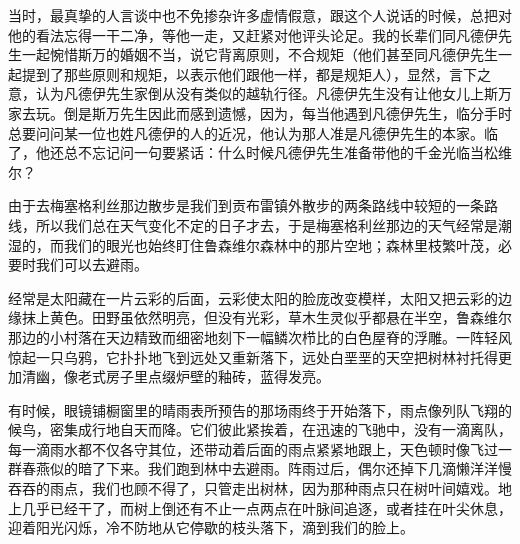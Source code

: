 \par 当时，最真挚的人言谈中也不免掺杂许多虚情假意，跟这个人说话的时候，总把对他的看法忘得一干二净，等他一走，又赶紧对他评头论足。我的长辈们同凡德伊先生一起惋惜斯万的婚姻不当，说它背离原则，不合规矩（他们甚至同凡德伊先生一起提到了那些原则和规矩，以表示他们跟他一样，都是规矩人），显然，言下之意，认为凡德伊先生家倒从没有类似的越轨行径。凡德伊先生没有让他女儿上斯万家去玩。倒是斯万先生因此而感到遗憾，因为，每当他遇到凡德伊先生，临分手时总要问问某一位也姓凡德伊的人的近况，他认为那人准是凡德伊先生的本家。临了，他还总不忘记问一句要紧话：什么时候凡德伊先生准备带他的千金光临当松维尔？
\par 由于去梅塞格利丝那边散步是我们到贡布雷镇外散步的两条路线中较短的一条路线，所以我们总在天气变化不定的日子才去，于是梅塞格利丝那边的天气经常是潮湿的，而我们的眼光也始终盯住鲁森维尔森林中的那片空地；森林里枝繁叶茂，必要时我们可以去避雨。
\par 经常是太阳藏在一片云彩的后面，云彩使太阳的脸庞改变模样，太阳又把云彩的边缘抹上黄色。田野虽依然明亮，但没有光彩，草木生灵似乎都悬在半空，鲁森维尔那边的小村落在天边精致而细密地刻下一幅鳞次栉比的白色屋脊的浮雕。一阵轻风惊起一只乌鸦，它扑扑地飞到远处又重新落下，远处白垩垩的天空把树林衬托得更加清幽，像老式房子里点缀炉壁的釉砖，蓝得发亮。
\par 有时候，眼镜铺橱窗里的晴雨表所预告的那场雨终于开始落下，雨点像列队飞翔的候鸟，密集成行地自天而降。它们彼此紧挨着，在迅速的飞驰中，没有一滴离队，每一滴雨水都不仅各守其位，还带动着后面的雨点紧紧地跟上，天色顿时像飞过一群春燕似的暗了下来。我们跑到林中去避雨。阵雨过后，偶尔还掉下几滴懒洋洋慢吞吞的雨点，我们也顾不得了，只管走出树林，因为那种雨点只在树叶间嬉戏。地上几乎已经干了，而树上倒还有不止一点两点在叶脉间追逐，或者挂在叶尖休息，迎着阳光闪烁，冷不防地从它停歇的枝头落下，滴到我们的脸上。
